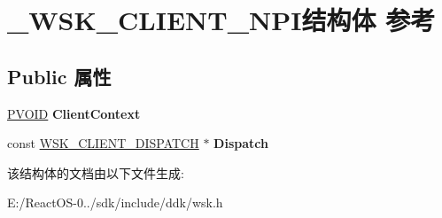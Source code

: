 \hypertarget{struct___w_s_k___c_l_i_e_n_t___n_p_i}{}\section{\+\_\+\+W\+S\+K\+\_\+\+C\+L\+I\+E\+N\+T\+\_\+\+N\+P\+I结构体 参考}
\label{struct___w_s_k___c_l_i_e_n_t___n_p_i}
\subsection*{Public 属性}
\begin{DoxyCompactItemize}
\item 
\mbox{\label{struct___w_s_k___c_l_i_e_n_t___n_p_i_ab9947bf0b968cdf4a55bdf7d7d7e77d3}} 
\hyperlink{interfacevoid}{P\+V\+O\+ID} {\bfseries Client\+Context}
\item 
\mbox{\label{struct___w_s_k___c_l_i_e_n_t___n_p_i_a2e06b46583d408d1084845cec98a6506}} 
const \hyperlink{struct___w_s_k___c_l_i_e_n_t___d_i_s_p_a_t_c_h}{W\+S\+K\+\_\+\+C\+L\+I\+E\+N\+T\+\_\+\+D\+I\+S\+P\+A\+T\+CH} $\ast$ {\bfseries Dispatch}
\end{DoxyCompactItemize}


该结构体的文档由以下文件生成\+:\begin{DoxyCompactItemize}
\item 
E\+:/\+React\+O\+S-\/0../sdk/include/ddk/wsk.\+h\end{DoxyCompactItemize}
